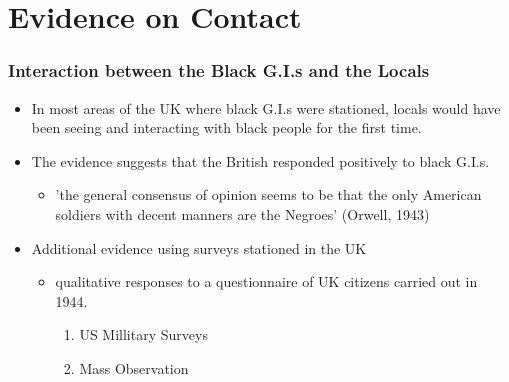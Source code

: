 \documentclass[dvipdfmx,11pt]{beamer}
\begin{document}
\section{Evidence on Contact}
\frame{\sectionpage}
\begin{frame}\frametitle{Interaction between the Black G.I.s and the Locals}
  \begin{itemize}
    \item In most areas of the UK where black G.I.s were stationed, locals would have been seeing and interacting with black people for the first time.
    \item The evidence suggests that the British responded positively to black G.I.s.
    \begin{itemize}
      \item 'the general consensus of opinion seems to be that the only American soldiers with decent manners are the Negroes' (Orwell, 1943)
    \end{itemize}
    \item Additional evidence using surveys stationed in the UK
    \begin{itemize}
      \item qualitative responses to a questionnaire of UK citizens carried out in 1944.
      \begin{enumerate}
        \item US Millitary Surveys
        \item Mass Observation
      \end{enumerate}
    \end{itemize}
  \end{itemize}
\end{frame}
\end{document}

